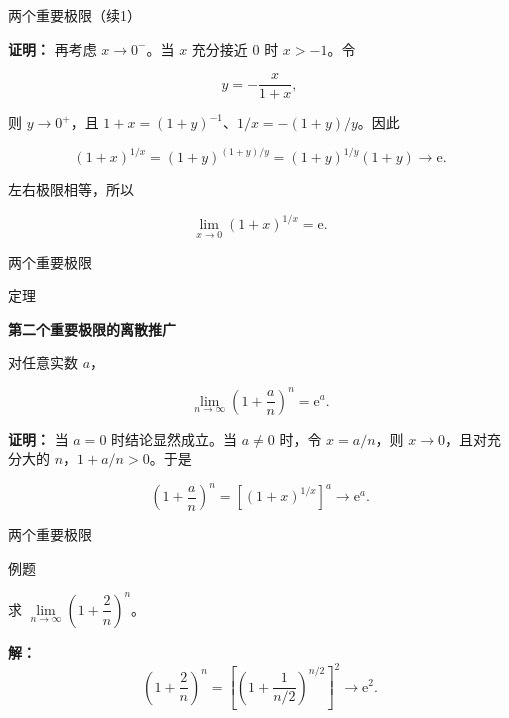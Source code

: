 \documentclass[aspectratio=169,10pt,fontset=fandol]{ctexbeamer}
\newcommand{\ee}{\mathrm{e}}
\begin{document}
\begin{frame}[t,fragile]{两个重要极限（续1）}
\normalsize
{\normalsize
\textbf{证明：}
再考虑 \(x\to0^-\)。当 \(x\) 充分接近 \(0\) 时 \(x>-1\)。令

\[

y=-\frac{x}{1+x},

\]

则 \(y\to0^+\)，且 \(1+x=(1+y)^{-1}\)、\(1/x=-(1+y)/y\)。因此

\[

(1+x)^{1/x}

=(1+y)^{(1+y)/y}

=(1+y)^{1/y}(1+y)\to\ee.

\]

左右极限相等，所以

\[

\lim_{x\to0}(1+x)^{1/x}=\ee.

\]


}
\end{frame}
\begin{frame}[t,fragile]{两个重要极限}
\normalsize
\begin{block}{定理}
{\normalsize
\textbf{第二个重要极限的离散推广}\par


对任意实数 \(a\)，

\[

\lim_{n\to\infty}\left(1+\frac an\right)^n=\ee^a.

\]


}
\end{block}
\pause
{\normalsize
\textbf{证明：}
当 \(a=0\) 时结论显然成立。当 \(a\neq0\) 时，令 \(x=a/n\)，则 \(x\to0\)，且对充分大的 \(n\)，\(1+a/n>0\)。于是

\[

\left(1+\frac an\right)^n

=\left[(1+x)^{1/x}\right]^a\longrightarrow\ee^a.

\]


}
\end{frame}
\begin{frame}[t,fragile]{两个重要极限}
\normalsize
\begin{block}{例题}
{\normalsize
求 \(\lim\limits_{n\to\infty} \left(1 + \dfrac{2}{n}\right)^n\)。


}
\end{block}
\pause
{\normalsize
\textbf{解：}
\[

	\left(1 + \dfrac{2}{n}\right)^n = \left[\left(1 + \dfrac{1}{n/2}\right)^{n/2}\right]^2 \to \ee^2.

	\]


}
\end{frame}
\end{document}
